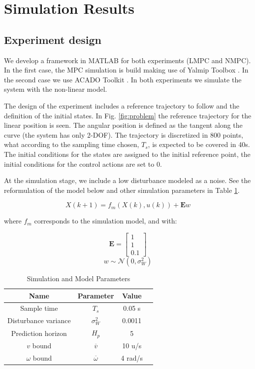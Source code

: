 \documentclass[conference]{IEEEtran}
\begin{document}
\section{Simulation Results}

\subsection{Experiment design}\label{CA}
We develop a framework in MATLAB\textregistered{} for both experiments (LMPC and NMPC). In the first case, the MPC simulation is build making use of Yalmip Toolbox \cite{1393890}. In the second case we use ACADO Toolkit \cite{Houska2011a}. In both experiments we simulate the system with the non-linear model.

The design of the experiment includes a reference trajectory to follow and the definition of the initial states. In Fig. \ref{fig:problem} the reference trajectory for the linear position is seen. The angular position is defined as the tangent along the curve (the system has only 2-DOF). The trajectory is discretized in 800 points, what according to the sampling time chosen, $T_{s}$, is expected to be covered in 40s. The initial conditions for the states are assigned to the initial reference point, the initial conditions for the control actions are set to 0.

At the simulation stage, we include a low disturbance modeled as a noise. See the reformulation of the model below and other simulation parameters in Table \ref{tab:param}.

\begin{equation} \label{eq:6}
X(k+1) = f_{m}(X(k),u(k)) + \mathbf{E} w
\end{equation}

where $f_{m}$ corresponds to the simulation model, and with:

\begin{equation*}
\mathbf{E} = \left[\begin{array}{c}
1 \\ 1 \\ 0.1 \end{array}\right]
\end{equation*}
\begin{equation*}
w \sim \mathcal{N}(0,\sigma_{W}^2)
\end{equation*}

\begin{table}
\centering
\begin{tabular}{c|c|c|c}
	Name & Parameter & Value \\\hline
	Sample time & $T_{s}$ & 0.05 s \\
	Disturbance variance & $\sigma_{W}^2$ & 0.0011  \\
    Prediction horizon & $H_{p}$ & 5 \\
    $v$ bound & $\overline{v}$ & 10 u/s\\
    $\omega$ bound & $\overline{\omega}$ & 4 rad/s \\
\end{tabular}
\caption{\label{tab:param}Simulation and Model Parameters}
\end{table}
\end{document}
